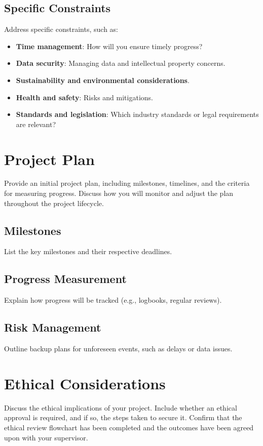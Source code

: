 \documentclass[a4paper, 11pt, twocolumn]{article}
\begin{document}
\subsection{Specific Constraints}
Address specific constraints, such as:
\begin{itemize}
    \item \textbf{Time management}: How will you ensure timely progress?
    \item \textbf{Data security}: Managing data and intellectual property concerns.
    \item \textbf{Sustainability and environmental considerations}.
    \item \textbf{Health and safety}: Risks and mitigations.
    \item \textbf{Standards and legislation}: Which industry standards or legal requirements are relevant?
\end{itemize}

\section{Project Plan}
\label{sec:plan}
Provide an initial project plan, including milestones, timelines, and the criteria for measuring progress. Discuss how you will monitor and adjust the plan throughout the project lifecycle.

\subsection{Milestones}
List the key milestones and their respective deadlines.

\subsection{Progress Measurement}
Explain how progress will be tracked (e.g., logbooks, regular reviews).

\subsection{Risk Management}
Outline backup plans for unforeseen events, such as delays or data issues.

\section{Ethical Considerations}
\label{sec:ethics}
Discuss the ethical implications of your project. Include whether an ethical approval is required, and if so, the steps taken to secure it. Confirm that the ethical review flowchart has been completed and the outcomes have been agreed upon with your supervisor.
\end{document}
